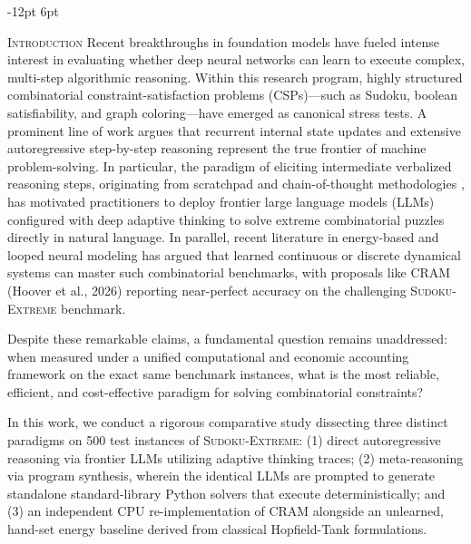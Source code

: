 \documentclass{article} %
\makeatletter
\renewcommand\section{\@startsection{section}{1}{\z@}%
  {-12pt \@plus -3pt \@minus -2pt}%
  {6pt \@plus 2pt}%
  {\normalfont\fontsize{12}{14}\selectfont\scshape\raggedright}}
\makeatother
\begin{document}
\section{\textsc{Introduction}}
\label{sec:intro}
Recent breakthroughs in foundation models have fueled intense interest in evaluating whether deep neural networks can learn to execute complex, multi-step algorithmic reasoning. Within this research program, highly structured combinatorial constraint-satisfaction problems (CSPs)---such as Sudoku, boolean satisfiability, and graph coloring---have emerged as canonical stress tests. A prominent line of work argues that recurrent internal state updates and extensive autoregressive step-by-step reasoning represent the true frontier of machine problem-solving. In particular, the paradigm of eliciting intermediate verbalized reasoning steps, originating from scratchpad and chain-of-thought methodologies \citep{Nye2021ShowYour}, has motivated practitioners to deploy frontier large language models (LLMs) configured with deep adaptive thinking to solve extreme combinatorial puzzles directly in natural language. In parallel, recent literature in energy-based and looped neural modeling has argued that learned continuous or discrete dynamical systems can master such combinatorial benchmarks, with proposals like CRAM (Hoover et al., 2026) reporting near-perfect accuracy on the challenging \textsc{Sudoku-Extreme} benchmark.

Despite these remarkable claims, a fundamental question remains unaddressed: when measured under a unified computational and economic accounting framework on the exact same benchmark instances, what is the most reliable, efficient, and cost-effective paradigm for solving combinatorial constraints? 

In this work, we conduct a rigorous comparative study dissecting three distinct paradigms on 500 test instances of \textsc{Sudoku-Extreme}: (1) direct autoregressive reasoning via frontier LLMs utilizing adaptive thinking traces; (2) meta-reasoning via program synthesis, wherein the identical LLMs are prompted to generate standalone standard-library Python solvers that execute deterministically; and (3) an independent CPU re-implementation of CRAM alongside an unlearned, hand-set energy baseline derived from classical Hopfield-Tank formulations. 
\end{document}
